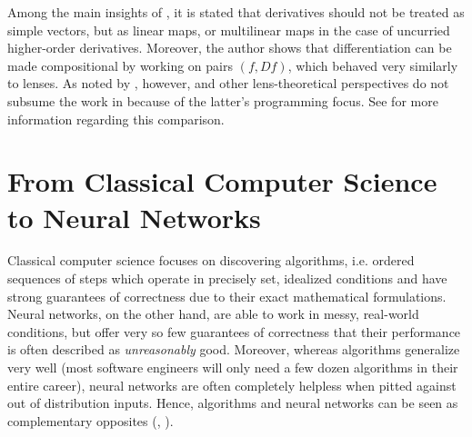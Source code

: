 \documentclass[11pt,a4paper,openright,twoside]{report}
\theoremstyle{plain}
\theoremstyle{definition}
\begin{document}
Among the main insights of \cite{elliott2018simple}, it is stated that derivatives should not be treated as simple vectors, but as linear maps, or multilinear maps in the case of uncurried higher-order derivatives. Moreover, the author shows that differentiation can be made compositional by working on pairs $(f, Df)$, which behaved very similarly to lenses. As noted by \cite{shiebler2021category}, however, \cite{cruttwell2022categorical} and other lens-theoretical perspectives do not subsume the work in \cite{elliott2018simple} because of the latter's programming focus. See \cite{shiebler2021category} for more information regarding this comparison.
































































\chapter{From Classical Computer Science to Neural Networks}


\lhead[\fancyplain{}{\bfseries\thepage}]{\fancyplain{}{\bfseries\rightmark}}




Classical computer science focuses on discovering algorithms, i.e. ordered sequences of steps which operate in precisely set, idealized conditions and have strong guarantees of correctness due to their exact mathematical formulations. Neural networks, on the other hand, are able to work in messy, real-world conditions, but offer very so few guarantees of correctness that their performance is often described as \textit{unreasonably} good. Moreover, whereas algorithms generalize very well (most software engineers will only need a few dozen algorithms in their entire career), neural networks are often completely helpless when pitted against out of distribution inputs. Hence, algorithms and neural networks can be seen as complementary opposites (\cite{velivckovic2021neural}, \cite{velivckovic2022clrs}).
\end{document}
